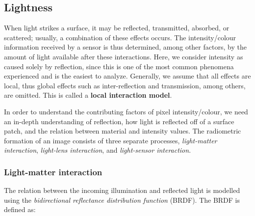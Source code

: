 
\subsection{Lightness}
When light strikes a surface, it may be reflected, transmitted, absorbed, or scattered; usually, a combination of these effects occurs. The intensity/colour information received by a sensor is thus determined, among other factors, by the amount of light available after these interactions. Here, we consider intensity as caused solely by reflection, since this is one of the most common phenomena experienced and is the easiest to analyze. Generally, we assume that all effects are local, thus global effects such as inter-reflection and transmission, among others, are omitted. This is called a \textbf{local interaction model}. 

In order to understand the contributing factors of pixel intensity/colour, we need an in-depth understanding of reflection, \ie how light is reflected off of a surface patch, and the relation between material and intensity values. The radiometric formation of an image consists of three separate processes, \textit{light-matter interaction}, \textit{light-lens interaction}, and \textit{light-sensor interaction}.

\subsubsection{Light-matter interaction}
The relation between the incoming illumination and reflected light is modelled using the \textit{bidirectional reflectance distribution function} (BRDF). The BRDF is defined as:

